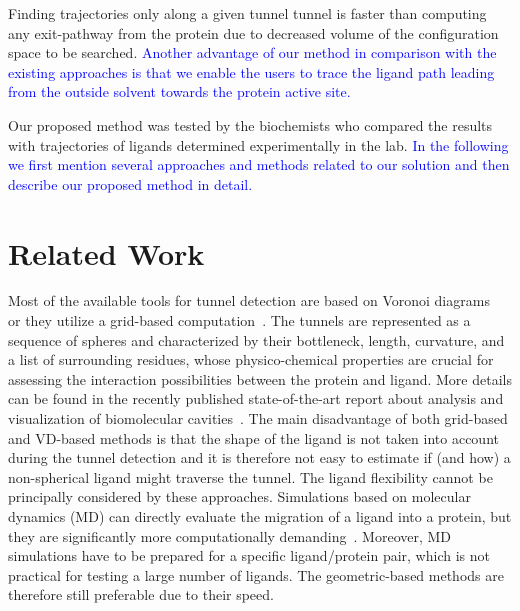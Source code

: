 \documentclass[usletter, 10pt, conference]{ieeeconf} %
\begin{document}
Finding trajectories only along a given tunnel tunnel is faster than computing any exit-pathway from the protein due to decreased
volume of the configuration space to be searched.
\textcolor{blue}{Another advantage of our method in comparison with the existing approaches is that we enable the users to trace the ligand path leading from the outside solvent towards the protein active site.}

Our proposed method was tested by the biochemists who compared the results with trajectories of ligands determined experimentally in the lab.
\textcolor{blue}{In the following we first mention several approaches and methods related to our solution and then describe our proposed method in detail.}

\section{Related Work}

Most of the available tools for tunnel detection are based on Voronoi diagrams~\cite{yaffe2008,caver3} or they utilize a grid-based computation~\cite{sehnal2013mole}.
The tunnels are represented as a sequence of spheres and characterized by their bottleneck, length, curvature, and a list of surrounding residues, whose physico-chemical properties are crucial for assessing the interaction possibilities between the protein and ligand.
More details can be found in the recently published state-of-the-art report about analysis and visualization of biomolecular cavities~\cite{Krone_2016}.
The main disadvantage of both grid-based and VD-based methods is that the shape of the ligand is not taken into account during the tunnel detection and it is therefore not easy to estimate if (and how) a non-spherical ligand might traverse the tunnel.
The ligand flexibility cannot be principally considered by these approaches.
Simulations based on molecular dynamics (MD) can directly evaluate the migration of a ligand into a protein, but they are significantly more computationally demanding~\cite{kingsley2014including}. 
Moreover, MD simulations have to be prepared for a specific ligand/protein pair, which is not practical for testing a large number of ligands.
The geometric-based methods are therefore still preferable due to their speed.
\end{document}
